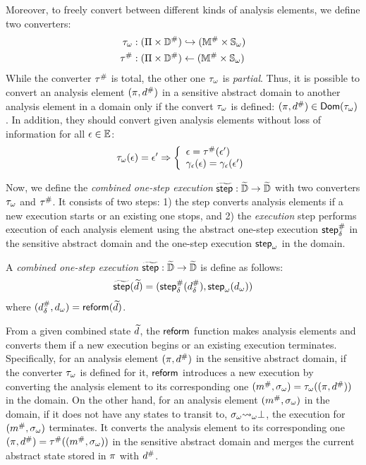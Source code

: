 Moreover, to freely convert between different kinds of analysis elements, we define two converters:
\begin{align}
  {\tau}_\omega & : (\Pi \times {\mathbb{D}}^{\#}) \hookrightarrow
    ({\mathbb{M}}^{\#} \times {\mathbb{S}}_\omega)\\
  {\tau}^{\#} & : (\Pi \times
    {\mathbb{D}}^{\#}) \leftarrow ({\mathbb{M}}^{\#} \times {\mathbb{S}}_\omega)
\end{align}
While the converter ${\tau}^{\#}$ is total, the other one ${\tau}_\omega$ is
\textit{partial}. Thus, it is possible to convert an analysis element
$(\pi, {d}^{\#})$ in a sensitive abstract domain to another analysis element in
a {\sealed} domain only if the convert ${\tau}_\omega$ is defined: $(\pi,
{d}^{\#}) \in \textsf{Dom}({\tau}_\omega)$.  In addition, they should convert given
analysis elements without loss of information for all $\epsilon \in \mathbb{E}$:
\[
  {\tau}_\omega(\epsilon) = \epsilon' \Rightarrow \left\{
  \begin{array}{l}
    \epsilon = {\tau}^{\#}(\epsilon')\\
    \gamma_{\epsilon}(\epsilon) = \gamma_{\epsilon}(\epsilon')\\
  \end{array}
  \right.
\]

Now, we define the \textit{combined one-step execution} $\widetilde{\textsf{step}}: \widetilde{\mathbb{D}}
\rightarrow \widetilde{\mathbb{D}}$ with two converters ${\tau}_\omega$ and ${\tau}^{\#}$.
It consists of two steps: 1) the \textit{} step converts
analysis elements if a new {\sealed} execution starts or an
existing one stops, and 2) the \textit{execution} step performs execution of each
analysis element using the abstract one-step execution ${\textsf{step}}^{\#}_\delta$ in the sensitive
abstract domain and the {\sealed} one-step execution ${\textsf{step}}_\omega$ in the {\sealed} domain.
\begin{definition}
A \textit{combined one-step execution} $\widetilde{\textsf{step}}: \widetilde{\mathbb{D}} \rightarrow
\widetilde{\mathbb{D}}$ is define as follows:
  \[
    \widetilde{\textsf{step}}(\widetilde{d}) = ({\textsf{step}}^{\#}_\delta({{d}^{\#}_\delta}), {\textsf{step}}_\omega({{d}_\omega}))
  \]
where $({{d}^{\#}_\delta}, {{d}_\omega}) = \textsf{reform}(\widetilde{d})$.
\end{definition}

From a given combined state $\widetilde{d}$, the $\textsf{reform}$ function makes analysis elements
and converts them if a new {\sealed} execution
begins or an existing {\sealed} execution terminates.
Specifically, for an analysis element $(\pi, {d}^{\#})$ in the sensitive abstract domain,
if the converter ${\tau}_\omega$ is defined for it, $\textsf{reform}$ introduces a new {\sealed} execution
by converting the analysis element to its corresponding one $({m}^{\#}, {\sigma}_\omega) =
{\tau}_\omega((\pi, {d}^{\#}))$ in the {\sealed} domain.
On the other hand, for an analysis element $({m}^{\#}, {\sigma}_\omega)$ in the {\sealed} domain,
if it does not have any {\sealed} states to transit to, ${\sigma}_\omega {\leadsto}_\omega \bot$,
the {\sealed} execution for $({m}^{\#}, {\sigma}_\omega)$ terminates.
It converts the analysis element to its corresponding one $(\pi, {d}^{\#}) =
{\tau}^{\#}(({m}^{\#}, {\sigma}_\omega))$ in the sensitive abstract domain and
merges the current abstract state stored in $\pi$ with ${d}^{\#}$.

